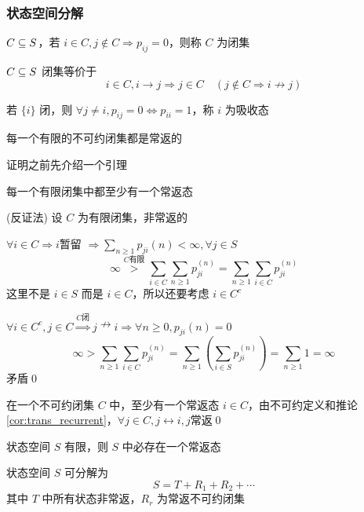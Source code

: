 \subsubsection{状态空间分解}
\begin{definition}[闭集]
    $C\subseteq S$，若 $i\in C,j\notin C\Rightarrow p_{ij}=0$，则称 $C$ 为闭集
\end{definition}

\begin{problem}[作业6-3]
    $C\subseteq S$ 闭集等价于
    \[
    i\in C,i\to j\Rightarrow j\in C\quad (j\notin C\Rightarrow i\nrightarrow j)
    \]
\end{problem}

\begin{example}
    若 $\{i\}$ 闭，则 $\forall j\neq i,p_{ij}=0\Leftrightarrow p_{ii}=1$，称 $i$ 为吸收态
\end{example}

\begin{theorem}
    每一个有限的不可约闭集都是常返的
\end{theorem}

证明之前先介绍一个引理

\begin{lemma}
    每一个有限闭集中都至少有一个常返态
\end{lemma}

(反证法) 设 $C$ 为有限闭集，非常返的

$\forall i\in C\Rightarrow i$暂留 $\Rightarrow \sum_{n\geq 1}p_{ji}(n)<\infty,\forall j\in S$
\[
\infty\overset{C\text{有限}}{>}\sum_{i\in C}\sum_{n\geq 1}p_{ji}^{(n)}=\sum_{n\geq 1}\sum_{i\in C}p_{ji}^{(n)}
\]
这里不是 $i\in S$ 而是 $i\in C$，所以还要考虑 $i\in C^c$

$\forall i\in C^c,j\in C\overset{C\text{闭}}{\Rightarrow}j\nrightarrow i \Rightarrow \forall n\geq 0,p_{ji}(n)=0$
\[
\infty>\sum_{n\geq 1}\sum_{i\in C}p_{ji}^{(n)}=\sum_{n\geq 1}\left(\sum_{i\in S}p_{ji}^{(n)}\right)=\sum_{n\geq 1}1=\infty
\]
矛盾\qed

在一个不可约闭集 $C$ 中，至少有一个常返态 $i\in C$，由不可约定义和推论\ref{cor:trans_recurrent}，$\forall j\in C,j\leftrightarrow i,j$常返\qed

\begin{corollary}
    状态空间 $S$ 有限，则 $S$ 中必存在一个常返态
\end{corollary}

\begin{theorem}[分解定理]
    状态空间 $S$ 可分解为
    \[
    S=T+R_1+R_2+\cdots
    \]
    其中 $T$ 中所有状态非常返，$R_r$ 为常返不可约闭集
\end{theorem}

